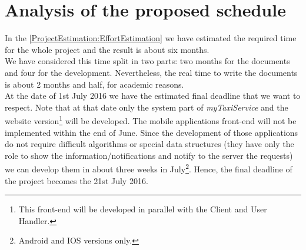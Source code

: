 \documentclass[\mainpath/main]{subfiles}
\begin{document}
\section{Analysis of the proposed schedule}
In the \autoref{ProjectEstimation:EffortEstimation} we have estimated the required time for the whole project and the result is about six months.\\ 
We have considered this time split in two parts: two months for the documents and four for the development. Nevertheless, the real time to write the documents is about 2 months and half, for academic reasons.\\
At the date of 1st July 2016 we have the estimated final deadline that we want to respect. Note that at that date only the system part of \textit{myTaxiService} and the website version\footnote{This front-end will be developed in parallel with the Client and User Handler.} will be developed. The mobile applications front-end will not be implemented within the end of June. Since the development of those applications do not require difficult algorithms or special data structures (they have only the role to show the information/notifications and notify to the server the requests) we can develop them in about three weeks in July\footnote{Android and IOS versions only.}. Hence, the final deadline of the project becomes the 21st July 2016.
\end{document}
